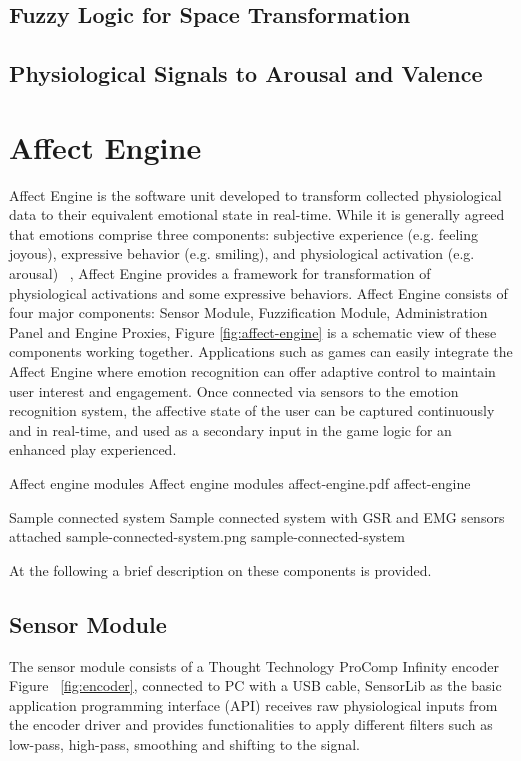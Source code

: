\subsection{Fuzzy Logic for Space Transformation}
\subsection{Physiological Signals to Arousal and Valence}


\section{Affect Engine} %
Affect Engine is the software unit developed to transform collected physiological data to their equivalent emotional state in real-time. While it is generally agreed that emotions comprise three components: subjective experience (e.g. feeling joyous), expressive behavior (e.g. smiling), and physiological activation (e.g. arousal) ~\cite{scherer1993neuroscience}, Affect Engine provides a framework for transformation of physiological activations and some expressive behaviors. Affect Engine consists of four major components: Sensor Module, Fuzzification Module, Administration Panel and Engine Proxies, Figure \ref{fig:affect-engine} is a schematic view of these components working together. Applications such as games can easily integrate the Affect Engine where emotion recognition can offer adaptive control to maintain user interest and engagement. Once connected via sensors to the emotion recognition system, the affective state of the user can be captured continuously and in real-time, and used as a secondary input in the game logic for an enhanced play experienced.

\img
{Affect engine modules}
{Affect engine modules}
{affect-engine.pdf}
{affect-engine}

\img
{Sample connected system}
{Sample connected system with GSR and EMG sensors attached}
{sample-connected-system.png}
{sample-connected-system}

At the following a brief description on these components is provided.

\subsection{Sensor Module} %
The sensor module consists of a Thought Technology ProComp Infinity encoder ~\cite{tt2013procomp} Figure ~\ref{fig:encoder}, connected to PC with a USB cable, SensorLib as the basic application programming interface (API) receives raw physiological inputs from the encoder driver and provides functionalities to apply different filters such as low-pass, high-pass, smoothing and shifting to the signal.

